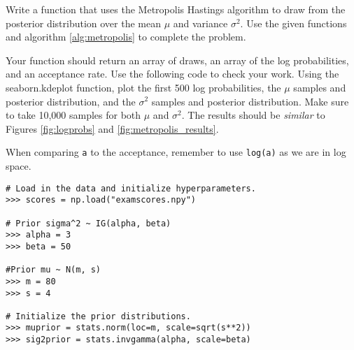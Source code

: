 \begin{comment}
\begin{figure}[h]
\centering
\texttt{[image: figures/logprobs.pdf]}
\caption{Log probabilities of our samples.}
\end{figure}

From this we can see that after between $300$ and $500$ iterations, we had converged to the correct distribution. We can visualize the path of our sampler by plotting the samples themselves:
\begin{figure}[h]
\centering
\texttt{[image: figures/samples.pdf]}
\caption{Samples from the Metropolis algorithm.}
\end{figure}

\begin{problem}
Using $\mu$ and $\Sigma$ as defined previously and using an initial state $\mathbf{x} = \left[ \begin{array}{cc} 1000 & -1000 \end{array} \right]$ run your Metropolis sampler for $10000$ iterations. Plot the log probs as well as the samples. How long did it take to converge?
\end{problem}
\end{comment}

\begin{problem}
Write a function that uses the Metropolis Hastings algorithm to draw from the posterior distribution over the mean $\mu$ and variance $\sigma^2$. Use the given functions and algorithm \ref{alg:metropolis} to complete the problem.

	Your function should return an array of draws, an array of the log probabilities, and an acceptance rate. Use the following code to check your work. Using the seaborn.kdeplot function, plot the first 500 log probabilities, the $\mu$ samples and posterior distribution, and the $\sigma^2$ samples and posterior distribution. Make sure to take 10,000 samples for both $\mu$ and $\sigma^2$. The results should be \textit{similar} to Figures \ref{fig:logprobs} and \ref{fig:metropolis_results}.

When comparing \texttt{a} to the acceptance, remember to use \texttt{log(a)} as we are in log space.


\begin{lstlisting}
# Load in the data and initialize hyperparameters.
>>> scores = np.load("examscores.npy")

# Prior sigma^2 ~ IG(alpha, beta)
>>> alpha = 3
>>> beta = 50

#Prior mu ~ N(m, s)
>>> m = 80
>>> s = 4

# Initialize the prior distributions.
>>> muprior = stats.norm(loc=m, scale=sqrt(s**2))
>>> sig2prior = stats.invgamma(alpha, scale=beta)
\end{lstlisting}

\end{problem}

